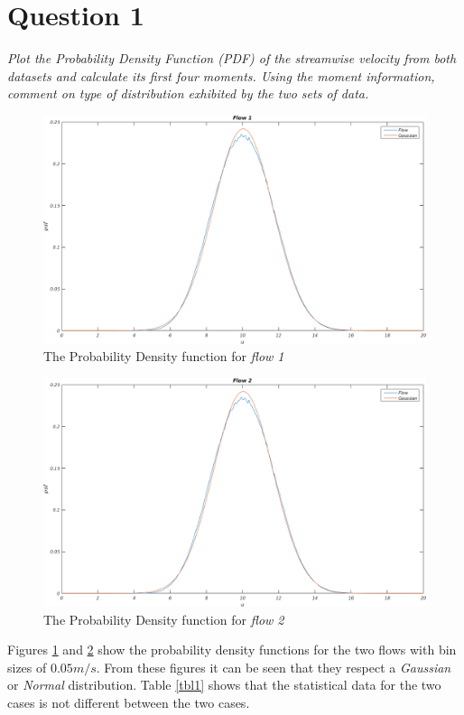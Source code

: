 \section*{Question 1}
\emph{Plot the Probability Density Function (PDF) of the streamwise velocity from both datasets and calculate its first four moments. Using the moment information, comment on type of distribution exhibited by the two sets of data.}

\begin{figure}[!ht]
\centering
\includegraphics[scale=0.4]{./TEXT/pdf1.png}
\caption{The Probability Density function for \emph{flow 1}}
\label{pdf1}
\end{figure}

\begin{figure}[!ht]
\centering
\includegraphics[scale=0.4]{./TEXT/pdf2.png}
\caption{The Probability Density function for \emph{flow 2}}
\label{pdf2}
\end{figure}

Figures \ref{pdf1} and \ref{pdf2} show the probability density functions for the two flows with bin sizes of $0.05 m/s$. From these figures it can be seen that they respect a \emph{Gaussian} or \emph{Normal} distribution. Table \ref{tbl1} shows that the statistical data for the two cases is not different between the two cases.

